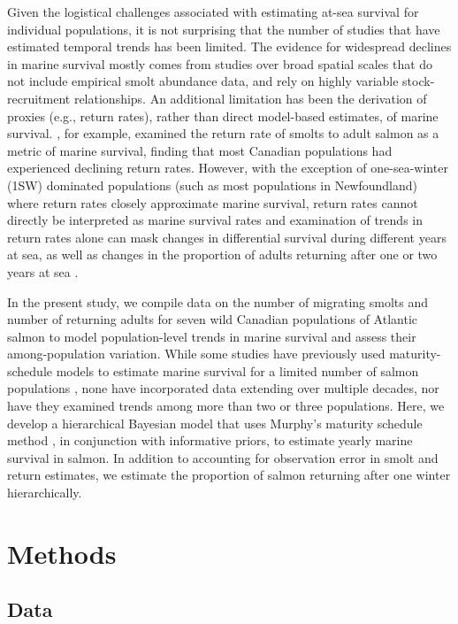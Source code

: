 \documentclass[12pt]{article}
\begin{document}

Given the logistical challenges associated with estimating at-sea survival for
individual populations, it is not surprising that the number of studies that
have estimated temporal trends has been limited. 
The evidence for widespread declines in marine survival mostly comes from studies
over broad spatial scales that do not include empirical smolt abundance data, and
rely on highly variable stock-recruitment relationships.
An additional limitation has been the derivation of
proxies (e.g., return rates), rather than direct model-based estimates, of
marine survival.
\citet{Chaput2012a}, for example, examined the return rate of smolts to adult salmon 
as a metric of marine survival, finding that most Canadian populations 
had experienced declining return rates. 
However, with the exception of one-sea-winter (1SW) dominated populations 
(such as most populations in Newfoundland) where return rates 
closely approximate marine survival, return rates cannot directly be interpreted as marine survival rates and 
examination of trends in return rates alone can mask changes in
differential survival during different years at sea, as well as changes in the
proportion of adults returning after one or two years at sea \citep{Hubley2011}.

In the present study, we compile data on the number of migrating smolts and number of returning adults 
for seven wild Canadian populations of Atlantic salmon to model population-level trends in marine survival
and assess their among-population variation.
While some studies have previously used maturity-schedule models to estimate marine
survival for a limited number of salmon populations \citep{Chaput2003b,Hubley2011}, none
have incorporated data extending over multiple decades, nor have they examined
trends among more than two or three populations. 
Here, we develop a hierarchical Bayesian model that uses Murphy's maturity
schedule method \citep{Murphy1952}, in conjunction with informative priors, to estimate yearly
marine survival in salmon. In addition to accounting for observation error in
smolt and return estimates, we estimate the proportion of salmon returning
after one winter hierarchically.

\section*{Methods}

\subsection*{Data}
\end{document}
